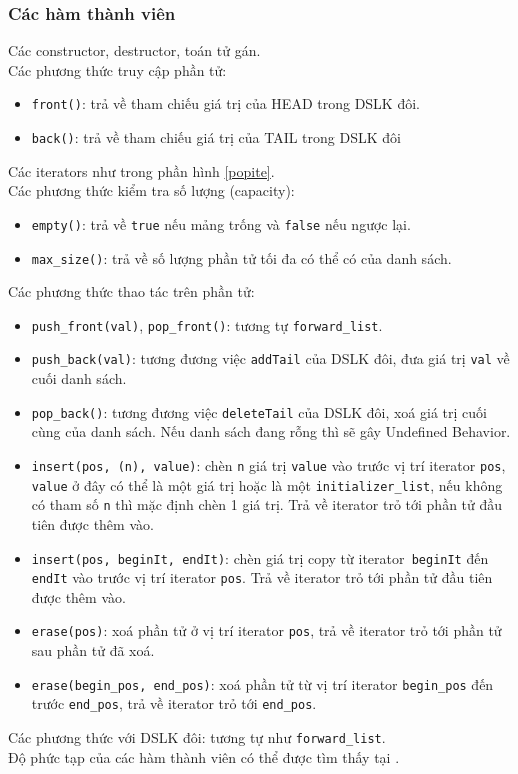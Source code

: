 \subsubsection{Các hàm thành viên}
Các constructor, destructor, toán tử gán.\\
Các phương thức truy cập phần tử:
\begin{itemize}
    \item \lstinline{front()}: trả về tham chiếu giá trị của HEAD trong DSLK đôi.
    \item \lstinline{back()}: trả về tham chiếu giá trị của TAIL trong DSLK đôi
\end{itemize}
Các iterators như trong phần hình \ref{popite}.\\
Các phương thức kiểm tra số lượng (capacity):
\begin{itemize}
    \item \lstinline{empty()}: trả về \lstinline{true} nếu mảng trống và \lstinline{false} nếu ngược lại.
    \item \lstinline{max_size()}: trả về số lượng phần tử tối đa có thể có của danh sách.
\end{itemize}
Các phương thức thao tác trên phần tử:
\begin{itemize} 
    \item \lstinline{push_front(val)},  \lstinline{pop_front()}: tương tự \lstinline{forward_list}.
    \item \lstinline{push_back(val)}: tương đương việc \lstinline{addTail} của DSLK đôi, đưa giá trị \lstinline{val} về cuối danh sách.
    \item \lstinline{pop_back()}: tương đương việc \lstinline{deleteTail} của DSLK đôi, xoá giá trị cuối cùng của danh sách. Nếu danh sách đang rỗng thì sẽ gây Undefined Behavior.
    \item \lstinline{insert(pos, (n), value)}: chèn \lstinline{n} giá trị \lstinline{value} vào trước vị trí iterator \lstinline{pos}, \lstinline{value} ở đây có thể là một giá trị hoặc là một \lstinline{initializer_list}, nếu không có tham số \lstinline{n} thì mặc định chèn 1 giá trị. Trả về iterator trỏ tới phần tử đầu tiên được thêm vào.
    \item \lstinline{insert(pos, beginIt, endIt)}: chèn giá trị copy từ iterator\lstinline{ beginIt} đến \lstinline{endIt} vào trước  vị trí iterator \lstinline{pos}. Trả về iterator trỏ tới phần tử đầu tiên được thêm vào.
    \item \lstinline{erase(pos)}: xoá phần tử ở vị trí iterator \lstinline{pos}, trả về iterator trỏ tới phần tử sau phần tử đã xoá.
    \item \lstinline{erase(begin_pos, end_pos)}: xoá phần tử từ vị trí iterator \lstinline{begin_pos} đến trước \lstinline{end_pos}, trả về iterator trỏ tới \lstinline{end_pos}.
\end{itemize}
Các phương thức với DSLK đôi: tương tự như \lstinline{forward_list}.\\
Độ phức tạp của các hàm thành viên có thể được tìm thấy tại \cite{list}.
